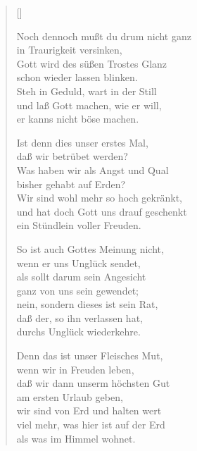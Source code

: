 \begin{multicols}{2}
\settowidth{\versewidth}{Noch dennoch mußt du drum nicht ganz}
\begin{verse}[\versewidth]

 Noch dennoch mußt du drum nicht ganz\\
in Traurigkeit versinken,\\
Gott wird des süßen Trostes Glanz\\
schon wieder lassen blinken.\\
Steh in Geduld, wart in der Still\\
und laß Gott machen, wie er will,\\
er kanns nicht böse machen.

 Ist denn dies unser erstes Mal,\\
daß wir betrübet werden?\\
Was haben wir als Angst und Qual\\
bisher gehabt auf Erden?\\
Wir sind wohl mehr so hoch gekränkt,\\
und hat doch Gott uns drauf geschenkt\\
ein Stündlein voller Freuden.

 So ist auch Gottes Meinung nicht,\\
wenn er uns Unglück sendet,\\
als sollt darum sein Angesicht\\
ganz von uns sein gewendet;\\
nein, sondern dieses ist sein Rat,\\
daß der, so ihn verlassen hat,\\
durchs Unglück wiederkehre.

 Denn das ist unser Fleisches Mut,\\
wenn wir in Freuden leben,\\
daß wir dann unserm höchsten Gut\\
am ersten Urlaub geben,\\
wir sind von Erd und halten wert\\
viel mehr, was hier ist auf der Erd\\
als was im Himmel wohnet.


\end{verse}
\end{multicols}
